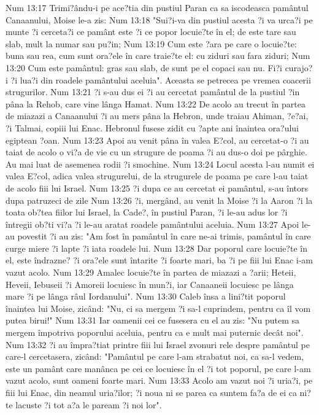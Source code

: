 Num 13:17  Trimi?ându-i pe ace?tia din pustiul Paran ca sa iscodeasca pamântul Canaanului, Moise le-a zis:
Num 13:18  "Sui?i-va din pustiul acesta ?i va urca?i pe munte ?i cerceta?i ce pamânt este ?i ce popor locuie?te în el; de este tare sau slab, mult la numar sau pu?in;
Num 13:19  Cum este ?ara pe care o locuie?te: buna sau rea, cum sunt ora?ele în care traie?te el: cu ziduri sau fara ziduri;
Num 13:20  Cum este pamântul: gras sau slab, de sunt pe el copaci sau nu. Fi?i curajo?i ?i lua?i din roadele pamântului aceluia". Aceasta se petrecea pe vremea coacerii strugurilor.
Num 13:21  ?i s-au dus ei ?i au cercetat pamântul de la pustiul ?in pâna la Rehob, care vine lânga Hamat.
Num 13:22  De acolo au trecut în partea de miazazi a Canaanului ?i au mers pâna la Hebron, unde traiau Ahiman, ?e?ai, ?i Talmai, copiii lui Enac. Hebronul fusese zidit cu ?apte ani înaintea ora?ului egiptean ?oan.
Num 13:23  Apoi au venit pâna în valea E?col, au cercetat-o ?i au taiat de acolo o vi?a de vie cu un strugure de poama ?i au dus-o doi pe pârghie. Au mai luat de asemenea rodii ?i smochine.
Num 13:24  Locul acesta l-au numit ei valea E?col, adica valea strugurelui, de la strugurele de poama pe care l-au taiat de acolo fiii lui Israel.
Num 13:25  ?i dupa ce au cercetat ei pamântul, s-au întors dupa patruzeci de zile
Num 13:26  ?i, mergând, au venit la Moise ?i la Aaron ?i la toata ob?tea fiilor lui Israel, la Cade?, în pustiul Paran, ?i le-au adus lor ?i întregii ob?ti vi?a ?i le-au aratat roadele pamântului aceluia.
Num 13:27  Apoi le-au povestit ?i au zis: "Am fost în pamântul în care ne-ai trimis, pamântul în care curge miere ?i lapte ?i iata roadele lui.
Num 13:28  Dar poporul care locuie?te în el, este îndrazne? ?i ora?ele sunt întarite ?i foarte mari, ba ?i pe fiii lui Enac i-am vazut acolo.
Num 13:29  Amalec locuie?te în partea de miazazi a ?arii; Heteii, Heveii, Iebuseii ?i Amoreii locuiesc în mun?i, iar Canaaneii locuiesc pe lânga mare ?i pe lânga râul Iordanului".
Num 13:30  Caleb însa a lini?tit poporul înaintea lui Moise, zicând: "Nu, ci sa mergem ?i sa-l cuprindem, pentru ca îl vom putea birui!"
Num 13:31  Iar oamenii cei ce fusesera cu el au zis: "Nu putem sa mergem împotriva poporului aceluia, pentru ca e mult mai puternic decât noi".
Num 13:32  ?i au împra?tiat printre fiii lui Israel zvonuri rele despre pamântul pe care-l cercetasera, zicând: "Pamântul pe care l-am strabatut noi, ca sa-l vedem, este un pamânt care manânca pe cei ce locuiesc în el ?i tot poporul, pe care l-am vazut acolo, sunt oameni foarte mari.
Num 13:33  Acolo am vazut noi ?i uria?i, pe fiii lui Enac, din neamul uria?ilor; ?i noua ni se parea ca suntem fa?a de ei ca ni?te lacuste ?i tot a?a le paream ?i noi lor".
